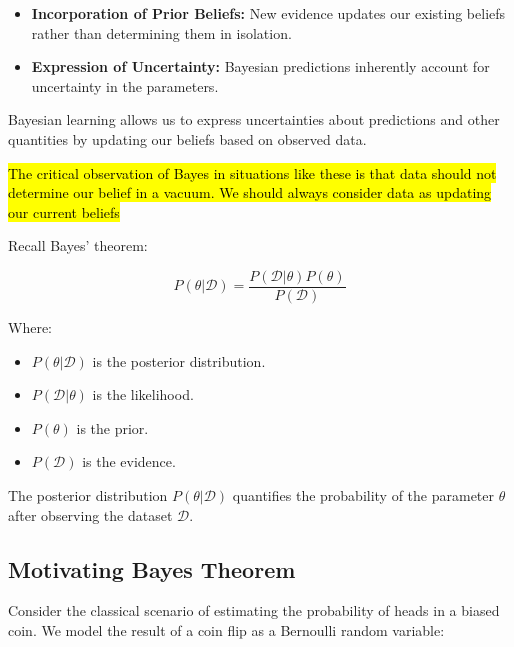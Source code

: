 \begin{itemize}
    \item \textbf{Incorporation of Prior Beliefs:} New evidence updates our existing beliefs rather than determining them in isolation.
    \item \textbf{Expression of Uncertainty:} Bayesian predictions inherently account for uncertainty in the parameters.
\end{itemize}

Bayesian learning allows us to express uncertainties about predictions and other quantities by updating our beliefs based on observed data.

\hl{The critical observation of Bayes in situations like these is that data should not determine our belief in a vacuum. We should always consider data as updating our current beliefs}



Recall Bayes' theorem:

\[
    P(\theta|\mathcal{D}) = \frac{P(\mathcal{D}|\theta)P(\theta)}{P(\mathcal{D})}
\]

Where:
\begin{itemize}
    \item \( P(\theta|\mathcal{D}) \) is the posterior distribution.
    \item \( P(\mathcal{D}|\theta) \) is the likelihood.
    \item \( P(\theta) \) is the prior.
    \item \( P(\mathcal{D}) \) is the evidence.
\end{itemize}

The posterior distribution \( P(\theta|\mathcal{D}) \) quantifies the probability of the parameter \( \theta \) after observing the dataset \( \mathcal{D} \).

\subsection{Motivating Bayes Theorem}

Consider the classical scenario of estimating the probability of heads in a biased coin. We model the result of a coin flip as a Bernoulli random variable:

